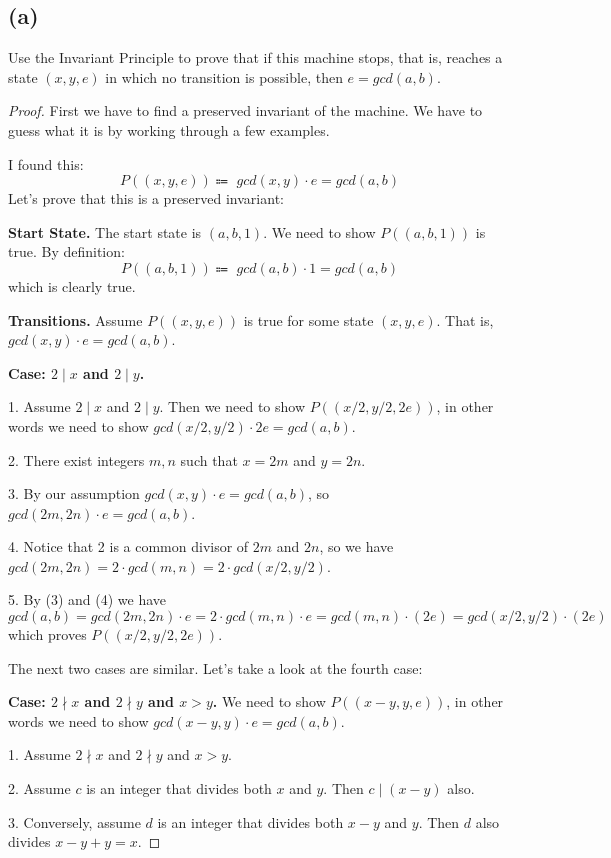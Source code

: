 \documentclass[14pt]{extarticle}
\begin{document}
\subsection{(a)}
Use the Invariant Principle to prove that if this machine stops, that is, reaches a state $(x, y, e)$ in which no transition is possible, then $e = gcd(a, b)$.
\begin{proof}
First we have to find a preserved invariant of the machine. We have to guess what it is by working through a few examples.

I found this:
$$
P((x, y, e)) \Coloneqq \,\, gcd(x, y) \cdot e = gcd(a, b)
$$
Let's prove that this is a preserved invariant:

{\bf Start State.} The start state is $(a, b, 1)$. We need to show $P((a, b, 1))$ is true. By definition:
$$
P((a, b, 1)) \Coloneqq \,\, gcd(a, b) \cdot 1 = gcd(a, b)
$$
which is clearly true.

{\bf Transitions.} Assume $P((x,y,e))$ is true for some state $(x,y,e)$. That is, $gcd(x, y) \cdot e = gcd(a, b)$.

{\bf Case: $2 \mid x$ and $2 \mid y$.}
 
1. Assume $2 \mid x$ and $2 \mid y$. Then we need to show $P((x/2, y/2, 2e))$, in other words we need to show $gcd(x/2, y/2) \cdot 2e = gcd(a,b)$.

2. There exist integers $m, n$ such that $x = 2m$ and $y = 2n$.

3. By our assumption $gcd(x, y) \cdot e = gcd(a, b)$, so $gcd(2m, 2n) \cdot e = gcd(a, b)$.

4. Notice that 2 is a common divisor of $2m$ and $2n$, so we have $gcd(2m, 2n) = 2 \cdot gcd(m, n) = 2 \cdot gcd(x/2,y/2)$.

5. By (3) and (4) we have 
$$
gcd(a, b) = gcd(2m, 2n) \cdot e = 2 \cdot gcd(m, n) \cdot e = gcd(m, n) \cdot (2e) = gcd(x/2, y/2) \cdot (2e)
$$
which proves $P((x/2, y/2, 2e))$.

The next two cases are similar. Let's take a look at the fourth case:

{\bf Case: $2 \nmid x$ and $2 \nmid y$ and $x > y$.} We need to show $P((x-y, y, e))$, in other words we need to show $gcd(x-y, y) \cdot e = gcd(a,b)$.

1. Assume $2 \nmid x$ and $2 \nmid y$ and $x > y$.

2. Assume $c$ is an integer that divides both $x$ and $y$. Then $c \mid (x - y)$ also. 

3. Conversely, assume $d$ is an integer that divides both $x - y$ and $y$. Then $d$ also divides $x - y + y = x$.


\end{proof}
\end{document}
